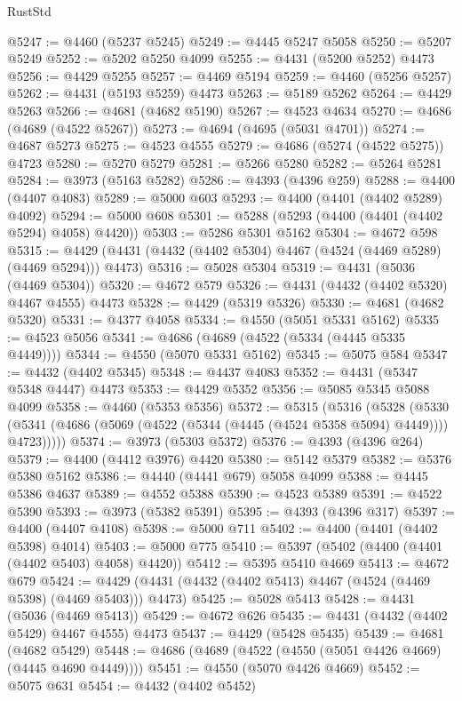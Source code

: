 \begin{lexlean}{RustStd}
\begin{coremodule}
@5247 := @4460 (@5237 @5245)
@5249 := @4445 @5247 @5058
@5250 := @5207 @5249
@5252 := @5202 @5250 @4099
@5255 := @4431 (@5200 @5252) @4473
@5256 := @4429 @5255
@5257 := @4469 @5194
@5259 := @4460 (@5256 @5257)
@5262 := @4431 (@5193 @5259) @4473
@5263 := @5189 @5262
@5264 := @4429 @5263
@5266 := @4681 (@4682 @5190)
@5267 := @4523 @4634
@5270 := @4686 (@4689 (@4522 @5267))
@5273 := @4694 (@4695 (@5031 @4701))
@5274 := @4687 @5273
@5275 := @4523 @4555
@5279 := @4686 (@5274 (@4522 @5275)) @4723
@5280 := @5270 @5279
@5281 := @5266 @5280
@5282 := @5264 @5281
@5284 := @3973 (@5163 @5282)
@5286 := @4393 (@4396 @259)
@5288 := @4400 (@4407 @4083)
@5289 := @5000 @603
@5293 := @4400 (@4401 (@4402 @5289) @4092)
@5294 := @5000 @608
@5301 := @5288 (@5293 (@4400 (@4401 (@4402 @5294) @4058) @4420))
@5303 := @5286 @5301 @5162
@5304 := @4672 @598
@5315 := @4429 (@4431 (@4432 (@4402 @5304) @4467 (@4524 (@4469 @5289) (@4469 @5294))) @4473)
@5316 := @5028 @5304
@5319 := @4431 (@5036 (@4469 @5304))
@5320 := @4672 @579
@5326 := @4431 (@4432 (@4402 @5320) @4467 @4555) @4473
@5328 := @4429 (@5319 @5326)
@5330 := @4681 (@4682 @5320)
@5331 := @4377 @4058
@5334 := @4550 (@5051 @5331 @5162)
@5335 := @4523 @5056
@5341 := @4686 (@4689 (@4522 (@5334 (@4445 @5335 @4449))))
@5344 := @4550 (@5070 @5331 @5162)
@5345 := @5075 @584
@5347 := @4432 (@4402 @5345)
@5348 := @4437 @4083
@5352 := @4431 (@5347 @5348 @4447) @4473
@5353 := @4429 @5352
@5356 := @5085 @5345 @5088 @4099
@5358 := @4460 (@5353 @5356)
@5372 := @5315
    (@5316
      (@5328
        (@5330 (@5341 (@4686 (@5069 (@4522 (@5344 (@4445 (@4524 @5358 @5094) @4449)))) @4723)))))
@5374 := @3973 (@5303 @5372)
@5376 := @4393 (@4396 @264)
@5379 := @4400 (@4412 @3976) @4420
@5380 := @5142 @5379
@5382 := @5376 @5380 @5162
@5386 := @4440 (@4441 @679) @5058 @4099
@5388 := @4445 @5386 @4637
@5389 := @4552 @5388
@5390 := @4523 @5389
@5391 := @4522 @5390
@5393 := @3973 (@5382 @5391)
@5395 := @4393 (@4396 @317)
@5397 := @4400 (@4407 @4108)
@5398 := @5000 @711
@5402 := @4400 (@4401 (@4402 @5398) @4014)
@5403 := @5000 @775
@5410 := @5397 (@5402 (@4400 (@4401 (@4402 @5403) @4058) @4420))
@5412 := @5395 @5410 @4669
@5413 := @4672 @679
@5424 := @4429 (@4431 (@4432 (@4402 @5413) @4467 (@4524 (@4469 @5398) (@4469 @5403))) @4473)
@5425 := @5028 @5413
@5428 := @4431 (@5036 (@4469 @5413))
@5429 := @4672 @626
@5435 := @4431 (@4432 (@4402 @5429) @4467 @4555) @4473
@5437 := @4429 (@5428 @5435)
@5439 := @4681 (@4682 @5429)
@5448 := @4686 (@4689 (@4522 (@4550 (@5051 @4426 @4669) (@4445 @4690 @4449))))
@5451 := @4550 (@5070 @4426 @4669)
@5452 := @5075 @631
@5454 := @4432 (@4402 @5452)

\end{coremodule}
\end{lexlean}
